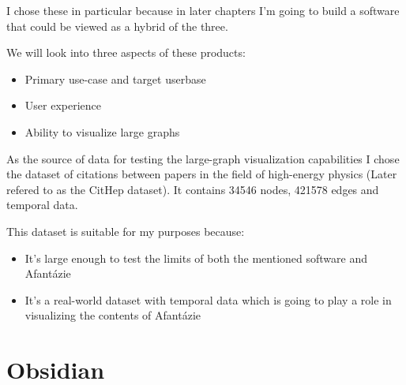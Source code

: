 I chose these in particular because in later chapters I'm going to build a software that could be viewed as a hybrid of the three.

We will look into three aspects of these products:
\begin{itemize}
  \item Primary use-case and target userbase
  \item User experience
  \item Ability to visualize large graphs
\end{itemize}

As the source of data for testing the large-graph visualization capabilities I chose the dataset of citations between papers
in the field of high-energy physics  (Later refered to as the CitHep dataset).
It contains 34546 nodes, 421578 edges and temporal data.

This dataset is suitable for my purposes because:
\begin{itemize}
  \item It's large enough to test the limits of both the mentioned software and Afantázie
  \item It's a real-world dataset with temporal data which is going to play a role in visualizing the contents of Afantázie
\end{itemize}

\section{Obsidian}




